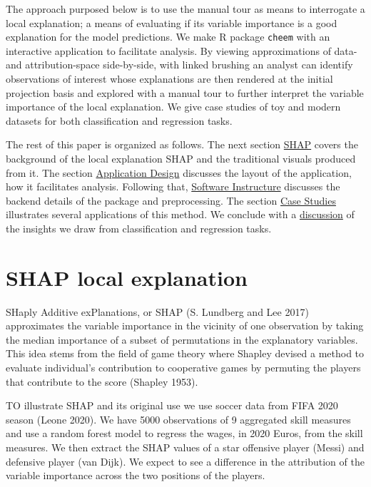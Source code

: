 \documentclass[
]{article}
\begin{document}
The approach purposed below is to use the manual tour as means to interrogate a local explanation; a means of evaluating if its variable importance is a good explanation for the model predictions. We make R package \texttt{cheem} with an interactive application to facilitate analysis. By viewing approximations of data- and attribution-space side-by-side, with linked brushing an analyst can identify observations of interest whose explanations are then rendered at the initial projection basis and explored with a manual tour to further interpret the variable importance of the local explanation. We give case studies of toy and modern datasets for both classification and regression tasks.

The rest of this paper is organized as follows. The next section \protect\hyperlink{sec:SHAP}{SHAP} covers the background of the local explanation SHAP and the traditional visuals produced from it. The section \protect\hyperlink{sec:applicationdesign}{Application Design} discusses the layout of the application, how it facilitates analysis. Following that, \protect\hyperlink{sec:softwareinfrastructure}{Software Instructure} discusses the backend details of the package and preprocessing. The section \protect\hyperlink{sec:casestudies}{Case Studies} illustrates several applications of this method. We conclude with a \protect\hyperlink{sec:discussion}{discussion} of the insights we draw from classification and regression tasks.

\hypertarget{sec:SHAP}{%
\section{SHAP local explanation}\label{sec:SHAP}}

SHaply Additive exPlanations, or SHAP (S. Lundberg and Lee 2017) approximates the variable importance in the vicinity of one observation by taking the median importance of a subset of permutations in the explanatory variables. This idea stems from the field of game theory where Shapley devised a method to evaluate individual's contribution to cooperative games by permuting the players that contribute to the score (Shapley 1953).

TO illustrate SHAP and its original use we use soccer data from FIFA 2020 season (Leone 2020). We have 5000 observations of 9 aggregated skill measures and use a random forest model to regress the wages, in 2020 Euros, from the skill measures. We then extract the SHAP values of a star offensive player (Messi) and defensive player (van Dijk). We expect to see a difference in the attribution of the variable importance across the two positions of the players.
\end{document}

